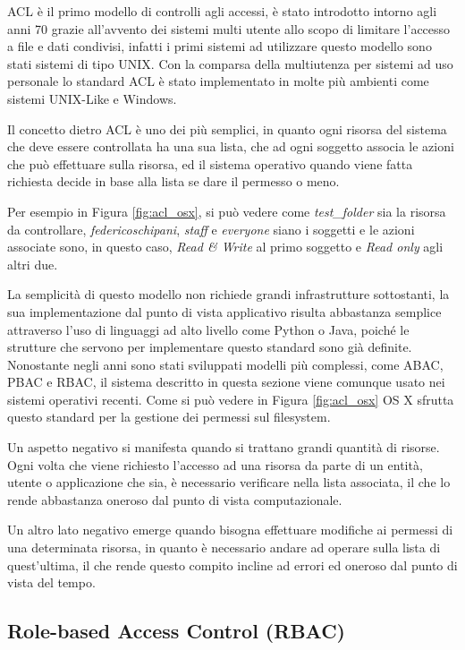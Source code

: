 \ac{ACL} è il primo modello di controlli agli accessi, è stato introdotto intorno agli anni 70 grazie all'avvento dei sistemi multi utente allo scopo di limitare l'accesso a file e dati condivisi, infatti i primi sistemi ad utilizzare questo modello sono stati sistemi di tipo UNIX. Con la comparsa della multiutenza per sistemi ad uso personale lo standard ACL è stato implementato in molte più ambienti come sistemi UNIX-Like e Windows. \par
Il concetto dietro ACL è uno dei più semplici, in quanto ogni risorsa del sistema che deve essere controllata ha una sua lista, che ad ogni soggetto associa le azioni che può effettuare sulla risorsa, ed il sistema operativo quando viene fatta richiesta decide in base alla lista se dare il permesso o meno. 


Per esempio in Figura \ref{fig:acl_osx}, si può vedere come \textit{test\_folder} sia la risorsa da controllare, \textit{federicoschipani}, \textit{staff} e \textit{everyone} siano i soggetti e le azioni associate sono, in questo caso, \textit{Read \& Write} al primo soggetto e \textit{Read only} agli altri due.


La semplicità di questo modello non richiede grandi infrastrutture sottostanti, la  sua implementazione dal punto di vista applicativo risulta abbastanza semplice attraverso l'uso di linguaggi ad alto livello come Python o Java, poiché le strutture che servono per implementare questo standard sono già definite.
Nonostante negli anni sono stati sviluppati modelli più complessi, come \ac{ABAC}, \ac{PBAC} e \ac{RBAC}, il sistema descritto in questa sezione viene comunque usato nei sistemi operativi recenti. Come si può vedere in Figura \ref{fig:acl_osx} OS X sfrutta questo standard per la gestione dei permessi sul filesystem. \par
Un aspetto negativo si manifesta quando si trattano grandi quantità di risorse. Ogni volta che viene richiesto l'accesso ad una risorsa da parte di un entità, utente o applicazione che sia, è necessario verificare nella lista associata, il che lo rende abbastanza oneroso dal punto di vista computazionale. \par
Un altro lato negativo emerge quando bisogna effettuare modifiche ai permessi di una determinata risorsa, in quanto è necessario andare ad operare sulla lista di quest'ultima, il che rende questo compito incline ad errori ed oneroso dal punto di vista del tempo.


\subsection*{Role-based Access Control (RBAC)} %
\label{sub:role_based_access_control}


